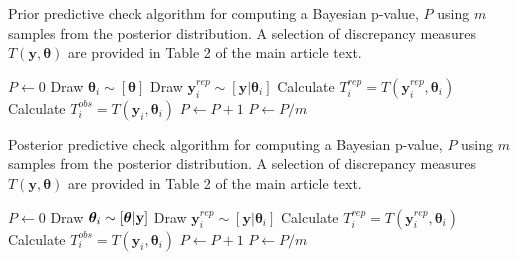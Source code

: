 \documentclass[12pt,english]{article}
\begin{document}
\rm \begin{flushleft}


\begin{algorithm}
\caption{Prior predictive check algorithm for computing a Bayesian p-value, $P$ using $m$ samples from the posterior distribution. A selection of discrepancy measures $T(\textbf{y},\boldsymbol{\theta})$ are provided in Table 2 of the main article text.}
\label{alg:prior}
\begin{algorithmic}
\STATE $P \leftarrow 0$
  \STATE Draw $\boldsymbol{\theta}_i \sim [\boldsymbol{\theta}]$
  \STATE Draw $\textbf{y}_i^{rep} \sim [\textbf{y} | \boldsymbol{\theta}_i]$ \STATE Calculate $T_i^{rep} = T(\textbf{y}_i^{rep},\boldsymbol{\theta}_i)$
  \STATE Calculate $T_i^{obs} = T(\textbf{y}_i,\boldsymbol{\theta}_i)$
    \STATE $P \leftarrow P+1$
  \ENDIF
\ENDFOR
\STATE $P \leftarrow P/m$
\end{algorithmic}
\end{algorithm}

\begin{algorithm}
\caption{Posterior predictive check algorithm for computing a Bayesian p-value, $P$ using $m$ samples from the posterior distribution.  A selection of discrepancy measures $T(\textbf{y},\boldsymbol{\theta})$ are provided in Table 2 of the main article text.}
\label{alg:posterior}
\begin{algorithmic}
\STATE $P \leftarrow 0$
  \STATE Draw $\boldsymbol{\theta}_i \sim [\boldsymbol{\theta}|{\bf y}]$
  \STATE Draw $\textbf{y}_i^{rep} \sim [\textbf{y} | \boldsymbol{\theta}_i]$ \STATE Calculate $T_i^{rep} = T(\textbf{y}_i^{rep},\boldsymbol{\theta}_i)$
  \STATE Calculate $T_i^{obs} = T(\textbf{y}_i,\boldsymbol{\theta}_i)$
    \STATE $P \leftarrow P+1$
  \ENDIF
\ENDFOR
\STATE $P \leftarrow P/m$
\end{algorithmic}
\end{algorithm}


\end{flushleft}
\end{document}
